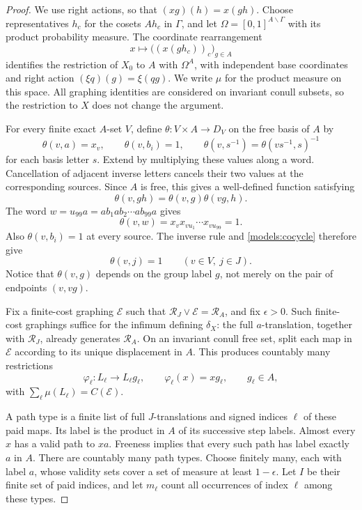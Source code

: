 \begin{proof}
We use right actions, so that $(xg)(h)=x(gh)$. Choose representatives
$h_c$ for the cosets $Ah_c$ in $\Gamma$, and let
$\Omega=[0,1]^{A\backslash\Gamma}$ with its product probability measure.
The coordinate rearrangement
\[
 x\longmapsto \bigl((x(gh_c))_c\bigr)_{g\in A}
\]
identifies the restriction of $X_0$ to $A$ with $\Omega^A$, with independent
base coordinates and right action $(\xi q)(g)=\xi(qg)$.
We write $\mu$ for the product measure on this space. All graphing
identities are considered on invariant conull subsets, so the
restriction to $X$ does not change the argument.

For every finite exact $A$-set $V$, define
$\theta:V\times A\to D_V$ on the free basis of $A$ by
\[
 \theta(v,a)=x_v,\qquad \theta(v,b_i)=1,
 \qquad
 \theta(v,s^{-1})=\theta(vs^{-1},s)^{-1}
\]
for each basis letter $s$. Extend by multiplying these values along a
word. Cancellation of adjacent inverse letters cancels their two
values at the corresponding sources. Since $A$ is free, this gives a
well-defined function satisfying
\begin{equation}
 \theta(v,gh)=\theta(v,g)\theta(vg,h).
 \label{models:cocycle}
\end{equation}
The word $w=u_{99}a=ab_1ab_2\cdots ab_{99}a$ gives
\[
 \theta(v,w)=x_vx_{vu_1}\cdots x_{vu_{99}}=1.
\]
Also $\theta(v,b_i)=1$ at every source. The inverse rule and
\eqref{models:cocycle} therefore give
\begin{equation}
 \theta(v,j)=1\qquad(v\in V,\ j\in J).
 \label{models:j-trivial}
\end{equation}
Notice that $\theta(v,g)$ depends on the group label $g$, not merely on
the pair of endpoints $(v,vg)$.

Fix a finite-cost graphing $\mathcal E$ such that
$\mathcal R_J\vee\mathcal E=\mathcal R_A$, and fix $\epsilon>0$.
Such finite-cost graphings suffice for the infimum defining $\delta_X$:
the full $a$-translation, together with $\mathcal R_J$, already
generates $\mathcal R_A$.
On an invariant conull free set, split each map in $\mathcal E$
according to its unique displacement in $A$. This produces countably
many restrictions
\[
 \varphi_\ell:L_\ell\longrightarrow L_\ell g_\ell,
 \qquad \varphi_\ell(x)=xg_\ell,
 \qquad g_\ell\in A,
\]
with $\sum_\ell\mu(L_\ell)=C(\mathcal E)$.

A path type is a finite list of full $J$-translations and signed
indices $\ell$ of these paid maps. Its label is the product in $A$ of
its successive step labels. Almost every $x$ has a valid path to $xa$.
Freeness implies that every such path has label exactly $a$ in $A$.
There are countably many path types. Choose finitely many, each with
label $a$, whose validity sets cover a set of measure at least
$1-\epsilon$. Let $I$ be their finite set of paid indices, and let
$m_\ell$ count all occurrences of index $\ell$ among these types.


\end{proof}
